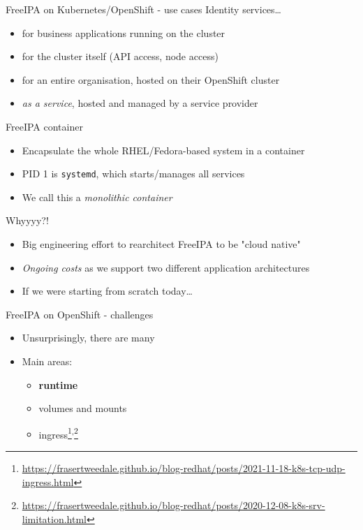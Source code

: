 \documentclass[ignorenonframetext,aspectratio=169,12pt]{beamer}
\begin{document}
\begin{frame}{FreeIPA on Kubernetes/OpenShift - use cases}
\protect\hypertarget{freeipa-openshift-use-cases}{}
Identity services\ldots{}
\begin{itemize}
\item for business applications running on the cluster
\item for the cluster itself (API access, node access)
\item for an entire organisation, hosted on their OpenShift cluster
\item {\em as a service}, hosted and managed by a service provider
\end{itemize}
\end{frame}

\begin{frame}{FreeIPA container}
\protect\hypertarget{freeipa-container}{}
\begin{itemize}
\item Encapsulate the whole RHEL/Fedora-based system in a container
\item PID 1 is {\tt systemd}, which starts/manages all services
\item We call this a {\em monolithic container}
\end{itemize}
\end{frame}


\begin{frame}{Whyyyy?!}
\protect\hypertarget{freeipa-monolith-why}{}
\begin{itemize}
\item Big engineering effort to rearchitect FreeIPA to be "cloud native"
\item {\em Ongoing costs} as we support two
    different application architectures
\item If we were starting from scratch today\ldots{}
\end{itemize}
\end{frame}


\begin{frame}{FreeIPA on OpenShift - challenges}
\protect\hypertarget{freeipa-openshift-challenges}{}
\begin{itemize}
\item Unsurprisingly, there are many
\item Main areas:
    \begin{itemize}
    \item {\bf runtime}
    \item volumes and mounts
    \item
    ingress\footnote{\url{https://frasertweedale.github.io/blog-redhat/posts/2021-11-18-k8s-tcp-udp-ingress.html}}\textsuperscript{,}\footnote{\url{https://frasertweedale.github.io/blog-redhat/posts/2020-12-08-k8s-srv-limitation.html}}
    \end{itemize}
\end{itemize}
\end{frame}
\end{document}
